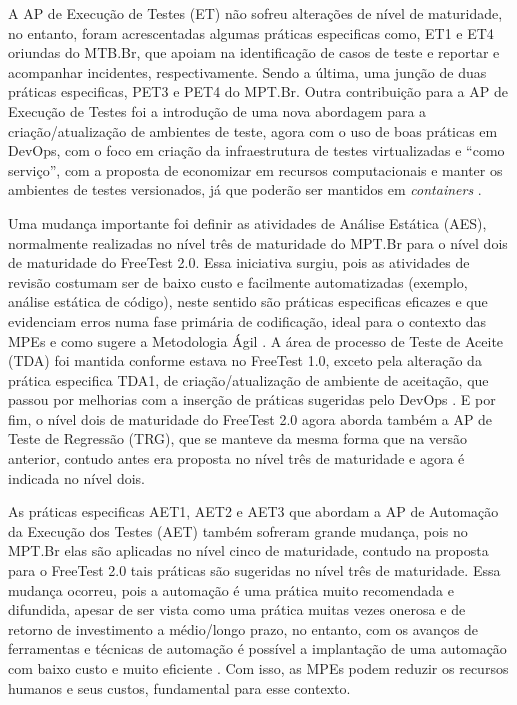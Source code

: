 A AP de Execução de Testes (ET) não sofreu alterações de nível de maturidade, no entanto, foram acrescentadas algumas práticas especificas como, ET1 e ET4 oriundas do MTB.Br, que apoiam na identificação de casos de teste e reportar e acompanhar incidentes, respectivamente. Sendo a última, uma junção de duas práticas especificas, PET3 e PET4 do MPT.Br. Outra contribuição para a AP de Execução de Testes foi a introdução de uma nova abordagem para a criação/atualização de ambientes de teste, agora com o uso de boas práticas em DevOps, com o foco em criação da infraestrutura de testes virtualizadas e “como serviço”, com a proposta de economizar em recursos computacionais e manter os ambientes de testes versionados, já que poderão ser mantidos em \textit{containers} \cite{BRAGA2015}.

Uma mudança importante foi definir as atividades de Análise Estática (AES), normalmente realizadas no nível três de maturidade do MPT.Br para o nível dois de maturidade do FreeTest 2.0. Essa iniciativa surgiu, pois as atividades de revisão costumam ser de baixo custo e facilmente automatizadas (exemplo, análise estática de código), neste sentido são práticas especificas eficazes e que evidenciam erros numa fase primária de codificação, ideal para o contexto das MPEs e como sugere a Metodologia Ágil \cite{Beck2001}. A área de processo de Teste de Aceite (TDA) foi mantida conforme estava no FreeTest 1.0, exceto pela alteração da prática especifica TDA1, de criação/atualização de ambiente de aceitação, que passou por melhorias com a inserção de práticas sugeridas pelo DevOps \cite{Howlett}. E por fim, o nível dois de maturidade do FreeTest 2.0 agora aborda também a AP de Teste de Regressão (TRG), que se manteve da mesma forma que na versão anterior, contudo antes era proposta no nível três de maturidade e agora é indicada no nível dois.

As práticas especificas AET1, AET2 e AET3 que abordam a AP de Automação da Execução dos Testes (AET) também sofreram grande mudança, pois no MPT.Br elas são aplicadas no nível cinco de maturidade, contudo na proposta para o FreeTest 2.0 tais práticas são sugeridas no nível três de maturidade. Essa mudança ocorreu, pois a automação é uma prática muito recomendada e difundida, apesar de ser vista como uma prática muitas vezes onerosa e de retorno de investimento a médio/longo prazo, no entanto, com os avanços de ferramentas e técnicas de automação é possível a implantação de uma automação com baixo custo e muito eficiente \cite{humble2010}. Com isso, as MPEs podem reduzir os recursos humanos e seus custos, fundamental para esse contexto. 


